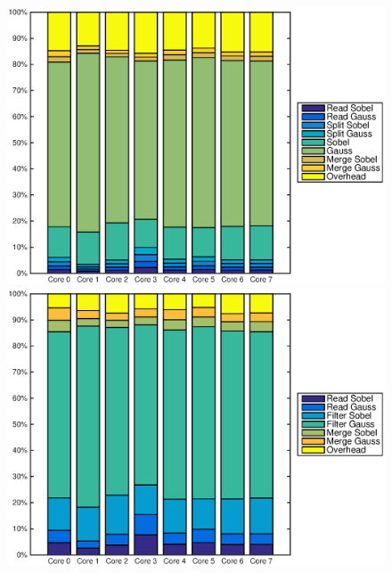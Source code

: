 \begin{figure}
    \centering
    \begin{minipage}{0.45\textwidth}
        \centering
        \includegraphics[width=0.99\linewidth]{images/openem_cifcif_10initial_func.eps}
    \end{minipage}
    \hfill
    \begin{minipage}{0.45\textwidth}
        \centering
        \includegraphics[width=0.99\linewidth]{images/openem_cifcif_10initial_eo.eps}
    \end{minipage}%
\end{figure}
